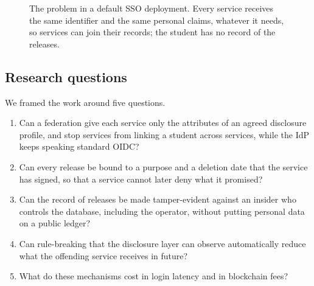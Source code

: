 \begin{figure}[t]
\centering
{}
\caption{The problem in a default SSO deployment. Every service receives the same identifier and the same personal claims, whatever it needs, so services can join their records; the student has no record of the releases.}
\label{fig:problem}
\end{figure}

\subsection{Research questions}
We framed the work around five questions.
\begin{enumerate}
\item[\textbf{RQ1}] Can a federation give each service only the attributes of an agreed disclosure profile, and stop services from linking a student across services, while the IdP keeps speaking standard OIDC?
\item[\textbf{RQ2}] Can every release be bound to a purpose and a deletion date that the service has signed, so that a service cannot later deny what it promised?
\item[\textbf{RQ3}] Can the record of releases be made tamper-evident against an insider who controls the database, including the operator, without putting personal data on a public ledger?
\item[\textbf{RQ4}] Can rule-breaking that the disclosure layer can observe automatically reduce what the offending service receives in future?
\item[\textbf{RQ5}] What do these mechanisms cost in login latency and in blockchain fees?
\end{enumerate}

